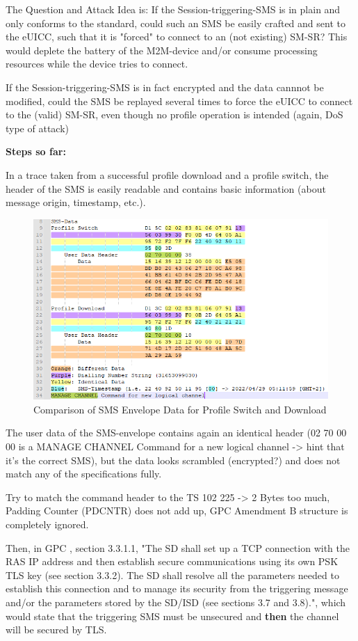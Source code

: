 The Question and Attack Idea is: If the Session-triggering-SMS is in plain and only conforms to the standard, could such an SMS be easily crafted and sent to the eUICC, such that it is "forced" to connect to an (not existing) SM-SR? This would deplete the battery of the M2M-device and/or consume processing resources while the device tries to connect.

If the Session-triggering-SMS is in fact encrypted and the data cannnot be modified, could the SMS be replayed several times to force the eUICC to connect to the (valid) SM-SR, even though no profile operation is intended (again, DoS type of attack)

\textbf{Steps so far:}

In a trace taken from a successful profile download and a profile switch, the header of the SMS is easily readable and contains basic information (about message origin, timestamp, etc.). 
\begin{figure}
    \centering
    \includegraphics[width=.75\textwidth]{pictures/SMS_trace.png}
    \caption{Comparison of SMS Envelope Data for Profile Switch and Download}
    \label{fig:APDUDat}
\end{figure}
The user data of the SMS-envelope contains again an identical header (02 70 00 00 is a MANAGE CHANNEL Command for a new logical channel -> hint that it's the correct SMS), but the data looks scrambled (encrypted?) and does not match any of the specifications fully.

Try to match the command header to the TS 102 225 \parencite{TS102:225} -> 2 Bytes too much, Padding Counter (PDCNTR) does not add up, GPC Amendment B \parencite{GPC:AmendB} structure is completely ignored.

Then, in GPC \parencite{GPC:AmendB}, section 3.3.1.1, "The SD shall set up a TCP connection with the RAS IP address and then establish secure communications using its own PSK TLS key (see section 3.3.2). The SD shall resolve all the parameters needed to establish this connection and to manage its security from the triggering message and/or the parameters stored by the
SD/ISD (see sections 3.7 and 3.8).", which would state that the triggering SMS must be unsecured and \textbf{then} the channel will be secured by TLS.

